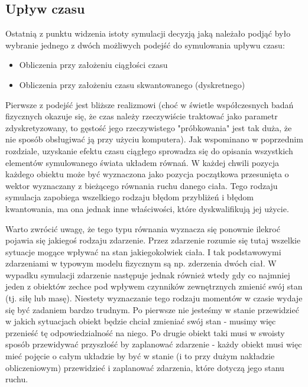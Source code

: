 {\subsection{Upływ czasu}
\par{
Ostatnią z punktu widzenia istoty symulacji decyzją jaką należało podjąć było wybranie jednego z dwóch możliwych podejść do symulowania upływu czasu:

\begin{itemize}
\item Obliczenia przy założeniu ciągłości czasu
\item Obliczenia przy założeniu czasu skwantowanego (dyskretnego)
\end{itemize}
}
\par{
Pierwsze z podejść jest bliższe realizmowi (choć w świetle współczesnych badań fizycznych okazuje się, że czas należy rzeczywiście traktować jako parametr zdyskretyzowany, to gęstość jego rzeczywistego "próbkowania" jest tak duża, że nie sposób obsługiwać ją przy użyciu komputera).
Jak wspominano w poprzednim rozdziale, uzyskanie efektu czasu ciągłego sprowadza się do opisania wszystkich elementów symulowanego świata układem równań. W każdej chwili pozycja każdego obiektu może być wyznaczona jako pozycja początkowa przesunięta o wektor wyznaczany z bieżącego równania ruchu danego ciała. Tego rodzaju symulacja zapobiega wszelkiego rodzaju błędom przybliżeń i błędom kwantowania, ma ona jednak inne właściwości, które dyskwalifikują jej użycie.
}
\par{
Warto zwrócić uwagę, że tego typu równania wyznacza się ponownie ilekroć pojawia się jakiegoś rodzaju zdarzenie. Przez zdarzenie rozumie się tutaj wszelkie sytuacje mogące wpływać na stan jakiegokolwiek ciała. I tak podstawowymi zdarzeniami w typowym modelu fizycznym są np. zderzenia dwóch ciał. W wypadku symulacji zdarzenie następuje jednak również wtedy gdy co najmniej jeden z obiektów zechce pod wpływem czynników zewnętrznych zmienić swój stan (tj. siłę lub masę). Niestety wyznaczanie tego rodzaju momentów w czasie wydaje się być zadaniem bardzo trudnym. Po pierwsze nie jesteśmy w stanie przewidzieć w jakich sytuacjach obiekt będzie chciał zmieniać swój stan - musimy więc przenieść tę odpowiedzialność na niego. Po drugie obiekt taki musi w swoisty sposób przewidywać przyszłość by zaplanować zdarzenie - każdy obiekt musi więc mieć pojęcie o całym układzie by być w stanie (i to przy dużym nakładzie obliczeniowym) przewidzieć i zaplanować zdarzenia, które dotyczą jego stanu ruchu.
}
\par{
}}
